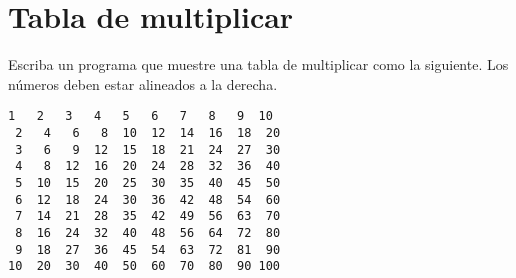 \section{Tabla de multiplicar}

Escriba un programa que muestre una tabla de multiplicar como la
si\-guien\-te.
Los números deben estar alineados a la derecha.
\begin{lstlisting}[language=testcase]
 1   2   3   4   5   6   7   8   9  10
 2   4   6   8  10  12  14  16  18  20
 3   6   9  12  15  18  21  24  27  30
 4   8  12  16  20  24  28  32  36  40
 5  10  15  20  25  30  35  40  45  50
 6  12  18  24  30  36  42  48  54  60
 7  14  21  28  35  42  49  56  63  70
 8  16  24  32  40  48  56  64  72  80
 9  18  27  36  45  54  63  72  81  90
10  20  30  40  50  60  70  80  90 100
\end{lstlisting}

